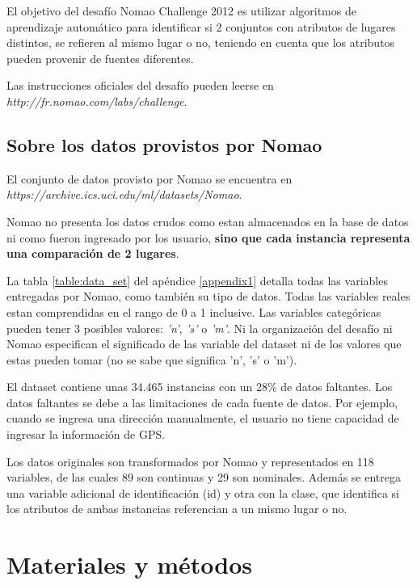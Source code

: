 \documentclass[journal]{IEEEtran}
\begin{document}
El objetivo del desafío Nomao Challenge 2012 es utilizar 
algoritmos de aprendizaje automático para identificar si 
2 conjuntos con atributos de lugares distintos, se refieren al mismo
lugar o no, teniendo en cuenta que los atributos 
pueden provenir de fuentes diferentes.

Las instrucciones oficiales del desafío pueden leerse en 
\textit{http://fr.nomao.com/labs/challenge}.

\subsection{Sobre los datos provistos por Nomao}

El conjunto de datos provisto por Nomao se encuentra en
\textit{https://archive.ics.uci.edu/ml/datasets/Nomao}. 

Nomao no presenta los datos crudos como estan almacenados en la 
base de datos ni como fueron ingresado por los usuario, \textbf{sino que  
cada instancia representa una comparación de 
2 lugares}. 

La tabla \ref{table:data_set} del apéndice \ref{appendix1} 
detalla todas las variables entregadas por 
Nomao, como también su tipo de datos. Todas las variables reales estan comprendidas
en el rango de 0 a 1 inclusive. Las variables
categóricas pueden tener 3 posibles valores: \textit{'n'}, \textit{'s'} 
o \textit{'m'}. Ni la organización del desafío ni Nomao especifican 
el significado de las variable del dataset ni de los valores
que estas pueden tomar (no se sabe que significa 'n', 's' o 'm').

El dataset contiene unas 34.465 instancias con un 28\% de datos faltantes.
Los datos faltantes se debe a las limitaciones de cada fuente de datos. Por
ejemplo, cuando se ingresa una dirección manualmente, el usuario no tiene
capacidad de ingresar la información de GPS.

Los datos originales son transformados por Nomao y representados
en 118 variables, de las cuales 89 son continuas y 29 son
nominales. Además se entrega una variable adicional de identificación (id) y
otra con la clase, que identifica si los atributos de ambas 
instancias referencian a un mismo lugar o no. 

\section{Materiales y métodos}
\end{document}
